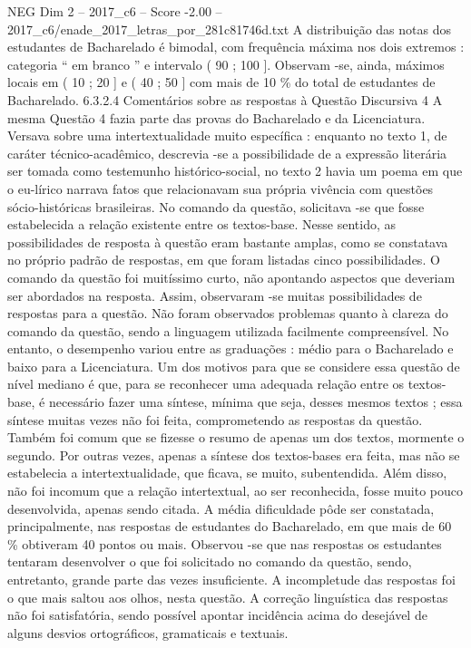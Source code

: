 \begin{textsample}{NEG Dim 2 – 2017\_c6 – Score -2.00 – 2017\_c6/enade\_2017\_letras\_por\_281c81746d.txt}
A distribuição das notas dos estudantes de Bacharelado é bimodal, com frequência máxima nos dois extremos : categoria “ em branco ” e intervalo ( 90 ; 100 ].
Observam -se, ainda, máximos locais em ( 10 ; 20 ] e ( 40 ; 50 ] com mais de 10 \% do total de estudantes de Bacharelado. 6.3.2.4 Comentários sobre as respostas à Questão Discursiva 4 A mesma Questão 4 fazia parte das provas do Bacharelado e da Licenciatura.
Versava sobre uma intertextualidade muito específica : enquanto no texto 1, de caráter técnico-acadêmico, descrevia -se a possibilidade de a expressão literária ser tomada como testemunho histórico-social, no texto 2 havia um poema em que o eu-lírico narrava fatos que relacionavam sua própria vivência com questões sócio-históricas brasileiras.
No comando da questão, solicitava -se que fosse estabelecida a relação existente entre os textos-base.
Nesse sentido, as possibilidades de resposta à questão eram bastante amplas, como se constatava no próprio padrão de respostas, em que foram listadas cinco possibilidades.
O comando da questão foi muitíssimo curto, não apontando aspectos que deveriam ser abordados na resposta.
Assim, observaram -se muitas possibilidades de respostas para a questão.
Não foram observados problemas quanto à clareza do comando da questão, sendo a linguagem utilizada facilmente compreensível.
No entanto, o desempenho variou entre as graduações : médio para o Bacharelado e baixo para a Licenciatura.
Um dos motivos para que se considere essa questão de nível mediano é que, para se reconhecer uma adequada relação entre os textos-base, é necessário fazer uma síntese, mínima que seja, desses mesmos textos ; essa síntese muitas vezes não foi feita, comprometendo as respostas da questão.
Também foi comum que se fizesse o resumo de apenas um dos textos, mormente o segundo.
Por outras vezes, apenas a síntese dos textos-bases era feita, mas não se estabelecia a intertextualidade, que ficava, se muito, subentendida.
Além disso, não foi incomum que a relação intertextual, ao ser reconhecida, fosse muito pouco desenvolvida, apenas sendo citada.
A média dificuldade pôde ser constatada, principalmente, nas respostas de estudantes do Bacharelado, em que mais de 60 \% obtiveram 40 pontos ou mais.
Observou -se que nas respostas os estudantes tentaram desenvolver o que foi solicitado no comando da questão, sendo, entretanto, grande parte das vezes insuficiente.
A incompletude das respostas foi o que mais saltou aos olhos, nesta questão.
A correção linguística das respostas não foi satisfatória, sendo possível apontar incidência acima do desejável de alguns desvios ortográficos, gramaticais e textuais.

\end{textsample}
